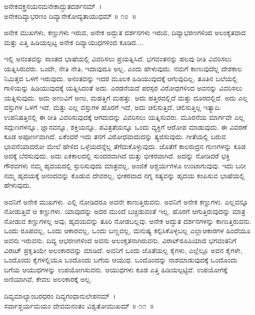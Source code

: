\begin{shloka}
ಅನೇಕವಕ್ತ್ರನಯನಮನೇಕಾದ್ಭುತದರ್ಶನಮ್~।\\ಅನೇಕದಿವ್ಯಾಭರಣಂ ದಿವ್ಯಾನೇಕೋದ್ಯತಾಯುಧಮ್ \hfill॥ ೧೦~॥
\end{shloka}

\begin{artha}
ಅನೇಕ ಮುಖಗಳು, ಕಣ್ಣುಗಳು ಇರುವ, ಅನೇಕ ಅದ್ಭುತ ದರ್ಶನಗಳು ಇರುವ, ದಿವ್ಯಾಭರಣಗಳಿಂದ ಅಲಂಕೃತವಾದ ಮತ್ತು ಎತ್ತಿ ಹಿಡಿಯಲ್ಪಟ್ಟ ಅನೇಕ ದಿವ್ಯಾಯುಧಗಳಿಂದ ಕೂಡಿದ....
\end{artha}

ಇಲ್ಲಿ ಅನಂತವನ್ನು ಸಾಂತದ ಭಾಷೆಯಲ್ಲಿ ವಿವರಿಸಲು ಪ್ರಯತ್ನಿಸಿದೆ. ಭಗವಂತನನ್ನು ಹಲವು ರೀತಿ ವಿವರಿಸಲು ಯತ್ನಿಸಿರುವರು. ಒಂದೇ, ನೇತಿ ನೇತಿ, ಇದಾವುದೂ ಅಲ್ಲ, ಎಂದು ಹೇಳುವುದು. ನಮಗೆ ಕಾಣುವುದೆಲ್ಲ ದೇಶಕಾಲ ನಿಮಿತ್ತದ ಒಳಗೆ ಇರುವುದು. ಅನಂತವನ್ನು ಇದರ ಮೂಲಕ ಹಿಡಿಯುವುದಕ್ಕೆ ಆಗುವುದಿಲ್ಲ. ತೂತಿನ ಬಲೆಯಲ್ಲಿ ಗಾಳಿಯನ್ನು ಹಿಡಿಯುವುದಕ್ಕೆ ಯತ್ನಿಸಿದಂತೆ ಅದು. ಎರಡನೆಯದೆ ಪರಸ್ಪರ ವಿರೋಧಗಳಿಂದ ಅವನನ್ನು ವಿವರಿಸಲು ಯತ್ನಿಸುವುದು. ಅದು ಅಣುವಿಗೆ ಅಣು, ಮಹತ್ತಿಗೆ ಮಹತ್ತು. ಅದು ಹತ್ತಿರದಲ್ಲಿದೆ ಮತ್ತು ದೂರದಲ್ಲಿದೆ. ಅದು ಎಲ್ಲ ವಸ್ತುಗಳ ಒಳಗೆ ಇದೆ, ಮತ್ತು ಎಲ್ಲ ವಸ್ತುಗಳ ಹೊರಗೆ ಇದೆ, ಅದು ಚಲಿಸುತ್ತಿದೆ, ಚಲಿಸುತ್ತಿಲ್ಲ ಇತ್ಯಾದಿ. ಉಪನಿಷತ್ತಿನಲ್ಲಿ ಈ ರೀತಿ ವಿವರಿಸುವುದಕ್ಕೆ ಆಗದುದನ್ನು ವಿವರಿಸಲು ಯತ್ನಿಸುವರು. ಮೂರನೆಯ ಮಾರ್ಗವೇ ಎಲ್ಲ ಸದ್ಗುಣಗಳನ್ನೂ, ಜ್ಞಾನವನ್ನೂ, ಶಕ್ತಿಯನ್ನೂ, ಪವಿತ್ರತೆಯನ್ನೂ ಒಂದು ವ್ಯಕ್ತಿಗೆ ಆರೋಪ ಮಾಡುವುದು. ಈ ವಿವರಣೆ ಕೂಡ ಅಪೂರ್ಣವಾಗಿದೆ. ಏಕೆಂದರೆ ಇದು ತನಗೆ ವಿರೋಧವಾದುದನ್ನು ತ್ಯಜಿಸುವುದು. ಗೀತೆಯಲ್ಲಿ ಬರುವ ಭಾವನೆಯಾದರೋ ಮೇಲೆ ಹೇಳಿದ ಒಳ್ಳೆಯದನ್ನೆಲ್ಲ ತೆಗೆದುಕೊಳ್ಳುವುದು. ಜೊತೆಗೆ ಕಾಲರುದ್ರನ ಗುಣಗಳನ್ನು ಕೂಡ ಅದಕ್ಕೆ ಬೆರಸುವುದು. ಅದು ಏಕಕಾಲದಲ್ಲಿ ಸುಂದರವಾಗಿದೆ ಮತ್ತು ಭೀಕರವಾಗಿದೆ. ಅದನ್ನು ನೋಡಿದರೆ ಭಕ್ತಿ ಗೌರವಗಳು ನಮ್ಮ ಹೃದಯದಲ್ಲಿ ಸ್ಫುರಿಸುವುದು ಮಾತ್ರವಲ್ಲ, ಅಂಜಿಕೆ ಆಶ್ಚರ್ಯಗಳೂ ಉಂಟಾಗುವುವು. ಇದು ಬರೀ ನಮ್ಮ ಹೃದಯಕ್ಕೆ ಆನಂದವನ್ನು ಕೊಡುವ ದೇವರಲ್ಲ, ಭೀಕರವಾದ ನಗ್ನ ಸತ್ಯವನ್ನು ಹೃದಯ ಕಂಪಿಸುವ ಭಾಷೆಯಲ್ಲಿ ಹೇಳುವುದು.

ಅವನಿಗೆ ಅನೇಕ ಮುಖಗಳು. ಎಲ್ಲಿ ನೋಡಿದರೂ ಅವನೇ ಕಾಣುತ್ತಿರುವನು. ಅವನಿಗೆ ಅನೇಕ ಕಣ್ಣುಗಳು. ಎಲ್ಲವನ್ನೂ ನೋಡುತ್ತಿವೆ ಆ ಕಣ್ಣುಗಳು. ಯಾವುದನ್ನು ಅದರ ಮುಂದೆ ಬಚ್ಚಿಡುವಂತೆ ಇಲ್ಲ. ಹೊರಗೆ ಆಗುತ್ತಿರುವುದನ್ನು ಮಾತ್ರ ನೋಡುವ ಕಣ್ಣುಗಳಲ್ಲ ಅವು, ಹೃದಯವನ್ನು ತೂರಿ ನೋಡಬಲ್ಲವು. ಅನೇಕ ಅದ್ಭುತ ದರ್ಶನಗಳನ್ನು ಕಾಣುತ್ತಿರುವನು. ಒಂದು ರೂಪವಲ್ಲ, ಒಂದು ಆಕಾರವಲ್ಲ, ಒಂದು ಬಣ್ಣವಲ್ಲ, ಮನುಷ್ಯ ಕಲ್ಪಿಸಿಕೊಳ್ಳಬಲ್ಲ ಎಲ್ಲಾ\break ಆಕಾರಗಳ ಹಿಂದೆಯೂ ಅವನು ಇರುವನು. ದಿವ್ಯ ಆಭರಣಗಳಿಂದ ಅವನು ಅಲಂಕೃತನಾಗಿರು\-ವನು. ವಿರಾಟ್​ರೂಪಿಯಾದ ಭಗವಂತನಿಗೆ ವಿರಾಟ್ ಪ್ರಕೃತಿಯೇ ಅಲಂಕಾರವನ್ನು ಮಾಡಿದೆ. ಅವನಿಗೆ ಒಂದು ಜೊತೆಯಲ್ಲ ಕೈಗಳು, ಎಲ್ಲೆಲ್ಲೂ ಅವನ ಕೈಗಳೇ, ಒಂದೊಂದು ಕೈಗಳಲ್ಲಿಯೂ ಒಂದೊಂದು ಬಗೆಯ ಆಯುಧ. ಒಂದೊಂದನ್ನು ನಾಶಮಾಡುವುದಕ್ಕೆ ಒಂದೊಂದು ಬಗೆಯ ಆಯುಧಗಳನ್ನು ಉಪಯೋಗಿಸುವನು. ಆಯುಧಗಳು ಕೂಡ ಎತ್ತಿ ಹಿಡಿಯಲ್ಪಟ್ಟಿವೆ. ಉಪ\-ಯೋಗಕ್ಕೆ ಅಣಿಯಾಗಿವೆ, ಕೇವಲ ಅಲಂಕಾರಕ್ಕೆ ಅಲ್ಲ.

\begin{shloka}
ದಿವ್ಯಮಾಲ್ಯಾಂಬರಧರಂ ದಿವ್ಯಗಂಧಾನುಲೇಪನಮ್~।\\ಸರ್ವಾಶ್ಚರ್ಯಮಯಂ ದೇವಮನಂತಂ ವಿಶ್ವತೋಮುಖಮ್ \hfill॥ ೧೧~॥
\end{shloka}

